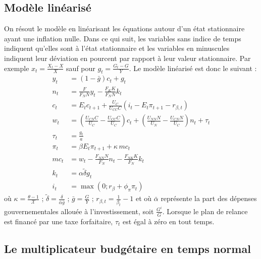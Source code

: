 \documentclass[12pt,letterpaper]{article}
\newcommand{\Et}{E_t}
\newcommand{\gbar}{\bar{g}}
\newcommand{\abar}{\bar{\alpha}}
\newcommand{\dtilde}{\tilde{\delta}}
\newcommand{\XX}{\mathcal{X}}
\begin{document}
\subsection{Modèle linéarisé}

On résout le modèle en linéarisant les équations autour d’un état stationnaire ayant une inflation nulle. Dans ce qui suit, les variables sans indice de temps indiquent qu’elles sont à l’état stationnaire et les variables en minuscules indiquent leur déviation en pourcent par rapport à leur valeur stationnaire. Par exemple $x_t = \frac{X_t - X}{X}$ sauf pour $g_t = \frac{G_t - G}{Y}$. Le modèle linéarisé est donc le suivant :
\begin{align}
y_t &= (1-\gbar)c_t + g_t \tag{24}\\
n_t &= \frac{F}{F_N N}y_t - \frac{F_K K}{F_N N}k_t \tag{25}\\
c_t &= \Et c_{t+1} + \frac{U_C}{U_{CC}C}\left(i_t - \Et\pi_{t+1} - r_{\beta,t}\right) \tag{26}\\
w_t &= \left(\frac{U_{CN}C}{U_C} - \frac{U_{CC}C}{U_C}\right)c_t + \left(\frac{U_{NN}N}{U_N} - \frac{U_{CN}N}{U_C}\right)n_t + \tau_t \tag{27}\\
\tau_t &= \frac{g_t}{a} \tag{28}\\
\pi_t &= \beta\Et\pi_{t+1} + \kappa\, mc_t \tag{29}\\
mc_t &= w_t - \frac{F_{NN}N}{F_N}n_t - \frac{F_{NK}K}{F_N}k_t \tag{30}\\
k_t &= \alpha\dtilde g_t \tag{31}\\
i_t &= \max(0; r_\beta + \phi_\pi\pi_t) \tag{32}
\end{align}
où $\kappa = \frac{\theta-1}{\XX}$ ; $\dtilde = \frac{\delta}{\abar\gbar}$ ; $\gbar = \frac{G}{Y}$ ; $r_{\beta,t} = \frac{1}{\beta_t} - 1$ et où $\abar$ représente la part des dépenses gouvernementales allouée à l’investissement, soit $\frac{G^i}{G}$. Lorsque le plan de relance est financé par une taxe forfaitaire, $\tau_t$ est égal à zéro en tout temps.

\subsection{Le multiplicateur budgétaire en temps normal}
\end{document}
